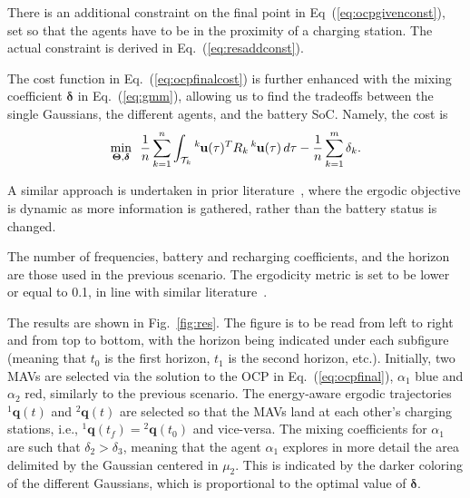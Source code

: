 \documentclass[letterpaper,10pt,conference,twoside]{IEEEtran}
\theoremstyle{definition}
\begin{document}
There is an additional constraint on the final point in Eq~(\ref{eq:ocpgivenconst}), set so that the agents have to be in the proximity of a charging station. The actual constraint is derived in Eq.~(\ref{eq:resaddconst}). %

The cost function in Eq.~(\ref{eq:ocpfinalcost}) is further enhanced with the mixing coefficient $\boldsymbol{\delta}$ in Eq.~(\ref{eq:gmm}), allowing us to find the tradeoffs between the single Gaussians, the different agents, and the battery SoC. Namely, the cost is
\begin{equation}
  \min_{\boldsymbol{\Theta},\boldsymbol{\delta}}\,\,\,{\frac{1}{n}\sum_{k=1}^{n}\int_{\mathcal{T}_k}{}^k\hspace*{-.1ex}\mathbf{u}(\tau)^TR_k\,{}^k\hspace*{-.1ex}\mathbf{u}(\tau)\,d\tau-\frac{1}{n}\sum_{k=1}^{m}\delta_k}.
\end{equation}

A similar approach is undertaken in prior literature~\cite{rao2023multi}, where the ergodic objective is dynamic as more information is gathered, rather than the battery status is changed.

The number of frequencies, battery and recharging coefficients, and the horizon are those used in the previous scenario.
The ergodicity metric %
is set to be lower or equal to 0.1, %
in line with similar literature~\cite{dong2023time}.

The results are shown in Fig.~\ref{fig:res}. The figure is to be read from left to right and from top to bottom, with the horizon being indicated under each subfigure (meaning that $t_0$ is the first horizon, $t_1$ is the second horizon, etc.). Initially, two MAVs are selected via the solution to the OCP in Eq.~(\ref{eq:ocpfinal}), $\alpha_1$ blue and $\alpha_2$ red, similarly to the previous scenario. %
The energy-aware ergodic trajectories ${}^1\mathbf{q}(t)$ and ${}^2\mathbf{q}(t)$ are selected so that the MAVs land at each other's charging stations, i.e., ${}^1\mathbf{q}(t_f)={}^2\mathbf{q}(t_0)$ and vice-versa. The mixing coefficients for $\alpha_1$ are such that $\delta_2>\delta_3$, meaning that the agent $\alpha_1$ explores in more detail the area delimited by the Gaussian centered in $\mu_2$. This is indicated by the darker coloring of the different Gaussians, which is proportional to the optimal value of $\boldsymbol{\delta}$. 
\end{document}
